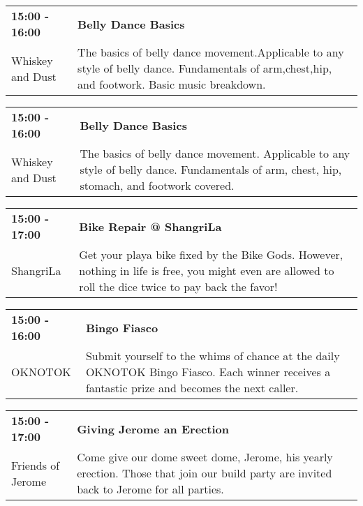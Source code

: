 \begin{tabular}{ p{1in} p{2.2in} }
    \textbf{15:00 - 16:00} & \textbf{Belly Dance Basics} \\
    Whiskey and Dust \newline  & The basics of belly dance movement.Applicable to any style of belly dance. Fundamentals of arm,chest,hip, and footwork. Basic music breakdown. \\
    \hline 
\end{tabular}
    
\begin{tabular}{ p{1in} p{2.2in} }
    \textbf{15:00 - 16:00} & \textbf{Belly Dance Basics} \\
    Whiskey and Dust \newline  & The basics of belly dance movement. Applicable to any style of belly dance. Fundamentals of arm, chest, hip, stomach, and footwork covered. \\
    \hline 
\end{tabular}
    
\begin{tabular}{ p{1in} p{2.2in} }
    \textbf{15:00 - 17:00} & \textbf{Bike Repair @ ShangriLa} \\
    ShangriLa \newline  & Get your playa bike fixed by the Bike Gods. However, nothing in life is free, you might even are allowed to roll the dice twice to pay back the favor! \\
    \hline 
\end{tabular}
    
\begin{tabular}{ p{1in} p{2.2in} }
    \textbf{15:00 - 16:00} & \textbf{Bingo Fiasco} \\
    OKNOTOK \newline  & Submit yourself to the whims of chance at the daily OKNOTOK Bingo Fiasco. Each winner receives a fantastic prize and becomes the next caller. \\
    \hline 
\end{tabular}
    
\begin{tabular}{ p{1in} p{2.2in} }
    \textbf{15:00 - 17:00} & \textbf{Giving Jerome an Erection} \\
    Friends of Jerome \newline  & Come give our dome sweet dome, Jerome, his yearly erection.  Those that join our build party are invited back to Jerome for all parties. \\
    \hline 
\end{tabular}
    
